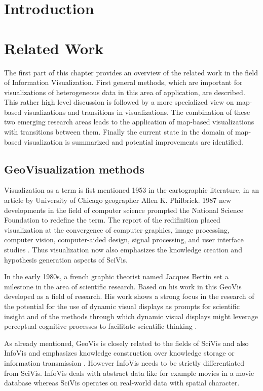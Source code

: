 \section{Introduction}

\section{Related Work}
The first part of this chapter provides an overview of the related work in the field of
Information Visualization. First general methods, which are important for visualizations of heterogeneous data in this area of application, are described. This rather high level discussion is followed by a more specialized view on map-based visualizations and transitions in visualizations. The combination of these two emerging research areas leads to the application of map-based visualizations with transitions between them. Finally the current state in the domain of map-based visualization is summarized and potential improvements are identified.

\subsection{GeoVisualization methods}
Visualization as a term is fist mentioned 1953 in the cartographic literature, in an article by University of Chicago geographer Allen K. Philbrick. 1987 new developments in the field of computer science prompted the National Science Foundation to redefine the term. The report of the redifinition placed visualization at the convergence of computer graphics, image processing, computer vision, computer-aided design, signal processing, and user interface studies . Thus visualization now also emphasizes the knowledge creation and hypothesis generation aspects of \ac{SciVis}.

In the early 1980s, a french graphic theorist named Jacques Bertin set a milestone in the area of scientific research. Based on his work in this \ac{GeoVis} developed as a field of research. His work shows a strong focus in the research of the potential for the use of dynamic visual displays as prompts for scientific insight and of the methods through which dynamic visual displays might leverage perceptual cognitive processes to facilitate scientific thinking .

As already mentioned, \ac{GeoVis} is closely related to the fields of \ac{SciVis} and also \ac{InfoVis} and emphasizes knowledge construction over knowledge storage or information transmission . However \ac{InfoVis} needs to be strictly differentiated from \ac{SciVis}. \ac{InfoVis} deals with abstract data like for example movies in a movie database whereas \ac{SciVis} operates on real-world data with spatial character.

